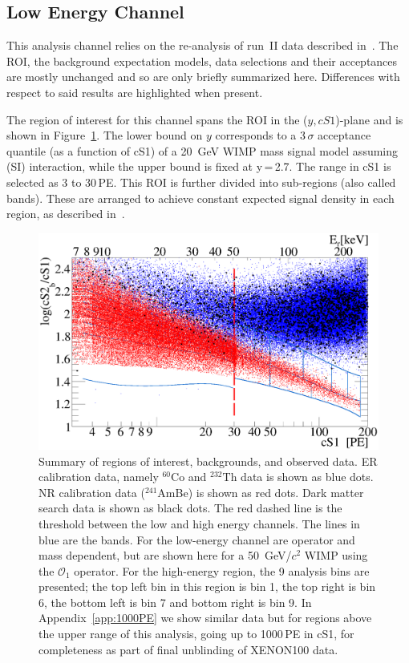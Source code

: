 
\subsection{Low Energy Channel}
\label{subsec:LowE}
This analysis channel relies on the re-analysis of run~II data described in~\cite{xe100_run_combination}. The ROI, the background 
expectation models, data selections and their acceptances are mostly unchanged and so are only briefly summarized here. Differences with respect to said results are highlighted when present.

The region of interest for this channel spans the ROI in the ($y,cS1$)-plane and is shown in Figure~\ref{fig:phasespace}.  The lower 
bound on $y$ corresponds to a 3\,$\sigma$ acceptance quantile (as a function of cS1) of a 20~GeV WIMP mass signal model assuming  (SI) interaction, while the upper bound is fixed at y\,=\,2.7.
The range in cS1 is selected as 3 to 30\,PE. This ROI is further divided into sub-regions  (also called bands). These are arranged to achieve constant expected signal density in each region, as described in~\cite{xe100_run_combination}.

\begin{figure}[]
\begin{minipage}{1\linewidth}
\centerline{\includegraphics[width=1\linewidth]{Figures/eft_sr.eps}}
\end{minipage}
\caption{Summary of regions of interest, backgrounds, and observed data. ER calibration data, namely $^{60}\mathrm{Co}$ and $^{232}\mathrm{Th}$ data is shown as blue dots. NR calibration data ($^{241}$AmBe) is shown as red dots. Dark matter search data is shown as black dots. The red dashed line is the threshold between the low and high energy channels. The lines in blue are the bands. For the low-energy channel  are operator and mass dependent, but are shown here for a 50~GeV/$c^2$ WIMP using the $\mathcal{O}_1$ operator. For the high-energy region, the 9 analysis bins are presented; the top left bin in this region is bin 1, the top right is bin 6, the bottom left is bin 7 and bottom right is bin 9. In Appendix~\ref{app:1000PE} we show similar data but for regions above the upper range of this analysis, going up to 1000\,PE in cS1, for completeness as part of final unblinding of XENON100 data. 
}
\label{fig:phasespace}
\end{figure}  


